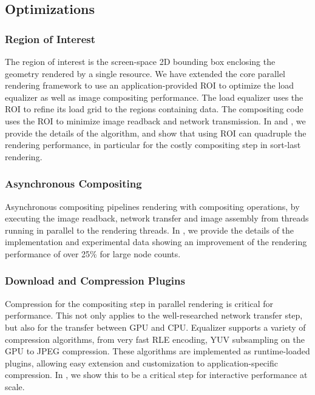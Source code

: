 \documentclass[10pt,journal,compsoc]{IEEEtran}
\begin{document}
\subsection{Optimizations}

\subsubsection{Region of Interest}

The region of interest is the screen-space 2D bounding box enclosing the
geometry rendered by a single resource. We have extended the core parallel
rendering framework to use an application-provided ROI to optimize the load
equalizer as well as image compositing performance. The load equalizer uses the
ROI to refine its load grid to the regions containing data. The compositing code
uses the ROI to minimize image readback and network transmission. In
\cite{MEP:10} and \cite{EBAHMP:12}, we provide the details of the algorithm, and
show that using ROI can quadruple the rendering performance, in particular for
the costly compositing step in sort-last rendering.

\subsubsection{Asynchronous Compositing}

Asynchronous compositing pipelines rendering with compositing operations, by
executing the image readback, network transfer and image assembly from threads
running in parallel to the rendering threads. In \cite{EBAHMP:12}, we provide
the details of the implementation and experimental data showing an improvement
of the rendering performance of over 25\% for large node counts.

\subsubsection{Download and Compression Plugins}

Compression for the compositing step in parallel rendering is critical for
performance. This not only applies to the well-researched network transfer step,
but also for the transfer between GPU and CPU. Equalizer supports a variety of
compression algorithms, from very fast RLE encoding, YUV
subsampling on the GPU to JPEG compression. These algorithms are implemented as runtime-loaded
plugins, allowing easy extension and customization to application-specific
compression. In \cite{MEP:10}, we show this to be a critical step for
interactive performance at scale.
\end{document}
